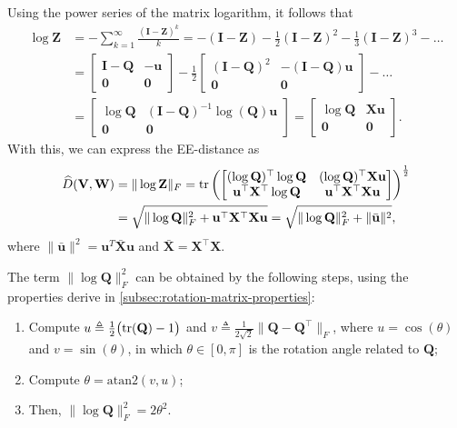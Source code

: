 Using the power series of the matrix logarithm, it follows that
\begin{align*}
    \log\mathbf{Z} &= -\sum_{k=1}^\infty \frac{(\mathbf{I} - \mathbf{Z})^k}{k} = - (\mathbf{I} - \mathbf{Z}) - \frac{1}{2}(\mathbf{I} - \mathbf{Z})^2 - \frac{1}{3} (\mathbf{I} - \mathbf{Z})^3 - \dots\\
    &=\begin{bmatrix}
        \mathbf{I} - \mathbf{Q} & -\mathbf{u}\\\mathbf{0} & \mathbf{0}
    \end{bmatrix} -
    \frac{1}{2}\begin{bmatrix}
        (\mathbf{I} - \mathbf{Q})^2 & -(\mathbf{I} - \mathbf{Q})\mathbf{u}\\\mathbf{0} & \mathbf{0}
    \end{bmatrix} - \dots\\
    &= \begin{bmatrix}
        \log\mathbf{Q} & (\mathbf{I} - \mathbf{Q})^{-1}\log(\mathbf{Q})\mathbf{u}\\\mathbf{0} & \mathbf{0}
    \end{bmatrix} = \begin{bmatrix}
        \log\mathbf{Q} & \mathbf{X}\mathbf{u}\\\mathbf{0} & \mathbf{0}
    \end{bmatrix}.
\end{align*}
With this, we can express the EE-distance as
\begin{align}
    \begin{split}
    \widehat{D}(\mathbf{V}, \mathbf{W}) &= \|\log\mathbf{Z}\|_F = \operatorname{tr}\left(
        \begin{bmatrix}
            (\log\mathbf{Q})^\top\log\mathbf{Q} & (\log\mathbf{Q})^\top\mathbf{X}\mathbf{u}\\
            \mathbf{u}^\top\mathbf{X}^\top\log\mathbf{Q} & \mathbf{u}^\top\mathbf{X}^\top\mathbf{X}\mathbf{u}
        \end{bmatrix}
    \right)^\frac{1}{2}\\
        &= \sqrt{\|\log\mathbf{Q}\|_F^2 + \mathbf{u}^\top\mathbf{X}^\top\mathbf{X}\mathbf{u}} = \sqrt{\|\log\mathbf{Q}\|_F^2 + \|\bar{\mathbf{u}}\|^2},
    \end{split}
\end{align}
where $\|\bar{\mathbf{u}}\|^2 = \mathbf{u}^T\bar{\mathbf{X}}\mathbf{u}$ and $\bar{\mathbf{X}}=\mathbf{X}^\top\mathbf{X}$.

The term $\|\log\mathbf{Q}\|_F^2$ can be obtained by the following steps, using the properties derive in \cref{subsec:rotation-matrix-properties}:
\begin{enumerate}
    \item Compute $u \triangleq \frac{1}{2}\bigl(\operatorname{tr}(\mathbf{Q})-1\bigr)$ and $v \triangleq \frac{1}{2\sqrt{2}}\|\mathbf{Q}{-}\mathbf{Q}^{\top}\|_F$, where $u = \cos(\theta)$ and $v=\sin(\theta)$, in which $\theta \in [0, \pi]$ is the rotation angle related to $\mathbf{Q}$;
    \item Compute $\theta = \text{atan2}(v,u)$;
    \item Then, $\|\log\mathbf{Q}\|_F^2 = 2\theta^2$.
\end{enumerate}

